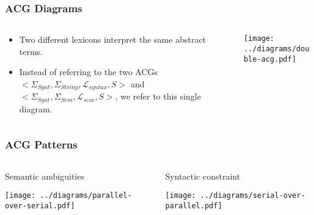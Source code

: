 \documentclass{beamer}
\begin{document}
\begin{frame}
  \frametitle{ACG Diagrams}

  \begin{columns}[c]
    \begin{column}{0.5\textwidth}
      \begin{itemize}
      \item Two different lexicons interpret the same abstract terms.
      \item Instead of referring to the two ACGs $\mathopen{<}
        \Sigma_{Synt}, \Sigma_{String}, \mathcal{L}_{syntax}, S
        \mathclose{>}$ and $\mathopen{<} \Sigma_{Synt}, \Sigma_{Sem},
        \mathcal{L}_{sem}, S \mathclose{>}$, we refer to this single
        diagram.
      \end{itemize}
    \end{column}
    \begin{column}{0.5\textwidth}
      \texttt{[image: ../diagrams/double-acg.pdf]}
    \end{column}
  \end{columns}
\end{frame}


\begin{frame}
  \frametitle{ACG Patterns}

  \begin{columns}[c]
    \begin{column}{0.5\textwidth}
      \begin{block}{Semantic ambiguities}
        \vspace{2 mm}
        \begin{center}
          \texttt{[image: ../diagrams/parallel-over-serial.pdf]}
        \end{center}
      \end{block}
    \end{column}
    \begin{column}{0.5\textwidth}
      \begin{block}{Syntactic constraint}
        \vspace{2 mm}
        \begin{center}
          \texttt{[image: ../diagrams/serial-over-parallel.pdf]}
        \end{center}
      \end{block}
    \end{column}
  \end{columns}
\end{frame}
\end{document}
